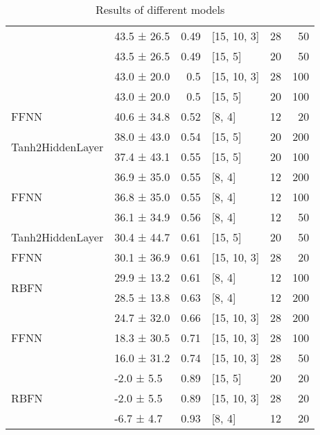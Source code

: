 \begin{table*}[h]
\begin{tabular}{llrlrr}
                                            & 43.5 ± 26.5 &  0.49 & [15, 10, 3]    &         28 &       50 \\
                                            & 43.5 ± 26.5 &  0.49 & [15, 5]        &         20 &       50 \\
                                            & 43.0 ± 20.0 &  0.5  & [15, 10, 3]    &         28 &      100 \\
                                            & 43.0 ± 20.0 &  0.5  & [15, 5]        &         20 &      100 \\
 \hline
FFNN                                & 40.6 ± 34.8 &  0.52 & [8, 4]         &         12 &       20 \\
 \hline
\multirow{2}{*}{Tanh2HiddenLayer}   & 38.0 ± 43.0 &  0.54 & [15, 5]        &         20 &      200 \\
                                            & 37.4 ± 43.1 &  0.55 & [15, 5]        &         20 &      100 \\
 \hline
\multirow{3}{*}{FFNN}               & 36.9 ± 35.0 &  0.55 & [8, 4]         &         12 &      200 \\
                                            & 36.8 ± 35.0 &  0.55 & [8, 4]         &         12 &      100 \\
                                            & 36.1 ± 34.9 &  0.56 & [8, 4]         &         12 &       50 \\
 \hline
Tanh2HiddenLayer                    & 30.4 ± 44.7 &  0.61 & [15, 5]        &         20 &       50 \\
 \hline
FFNN                                & 30.1 ± 36.9 &  0.61 & [15, 10, 3]    &         28 &       20 \\
 \hline
\multirow{2}{*}{RBFN}               & 29.9 ± 13.2 &  0.61 & [8, 4]         &         12 &      100 \\
                                            & 28.5 ± 13.8 &  0.63 & [8, 4]         &         12 &      200 \\
 \hline
\multirow{3}{*}{FFNN}               & 24.7 ± 32.0 &  0.66 & [15, 10, 3]    &         28 &      200 \\
                                            & 18.3 ± 30.5 &  0.71 & [15, 10, 3]    &         28 &      100 \\
                                            & 16.0 ± 31.2 &  0.74 & [15, 10, 3]    &         28 &       50 \\
 \hline
\multirow{3}{*}{RBFN}               & -2.0 ± 5.5  &  0.89 & [15, 5]        &         20 &       20 \\
                                            & -2.0 ± 5.5  &  0.89 & [15, 10, 3]    &         28 &       20 \\
                                            & -6.7 ± 4.7  &  0.93 & [8, 4]         &         12 &       20 \\
\hline
\end{tabular}
        \caption{Results of different models}
        \label{models}
    \end{table*}
    
